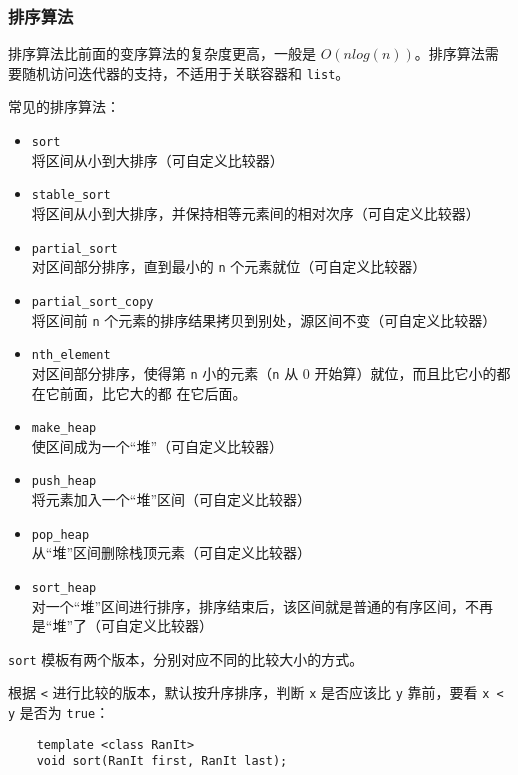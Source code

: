\documentclass[UTF8]{ctexart}
\begin{document}
\subsubsection{排序算法}
排序算法比前面的变序算法的复杂度更高，一般是 $O(nlog(n))$。排序算法需要随机访问迭代器的支持，不适用于关联容器和
\texttt{list}。

常见的排序算法：
\begin{itemize}
    \item \texttt{sort} \\
    将区间从小到大排序（可自定义比较器）
    \item \texttt{stable\_sort} \\
    将区间从小到大排序，并保持相等元素间的相对次序（可自定义比较器）
    \item \texttt{partial\_sort} \\
    对区间部分排序，直到最小的 \texttt{n} 个元素就位（可自定义比较器）
    \item \texttt{partial\_sort\_copy} \\
    将区间前 \texttt{n} 个元素的排序结果拷贝到别处，源区间不变（可自定义比较器）
    \item \texttt{nth\_element} \\
    对区间部分排序，使得第 \texttt{n} 小的元素（\texttt{n} 从 0 开始算）就位，而且比它小的都在它前面，比它大的都
    在它后面。
    \item \texttt{make\_heap} \\
    使区间成为一个“堆”（可自定义比较器）
    \item \texttt{push\_heap} \\
    将元素加入一个“堆”区间（可自定义比较器）
    \item \texttt{pop\_heap} \\
    从“堆”区间删除栈顶元素（可自定义比较器）
    \item \texttt{sort\_heap} \\
    对一个“堆”区间进行排序，排序结束后，该区间就是普通的有序区间，不再是“堆”了（可自定义比较器）
\end{itemize}

\texttt{sort} 模板有两个版本，分别对应不同的比较大小的方式。

根据 \texttt{<} 进行比较的版本，默认按升序排序，判断 \texttt{x} 是否应该比 \texttt{y} 靠前，要看
\texttt{x < y} 是否为 \texttt{true}：
\begin{verbatim}
    template <class RanIt>
    void sort(RanIt first, RanIt last);
\end{verbatim}
\end{document}
